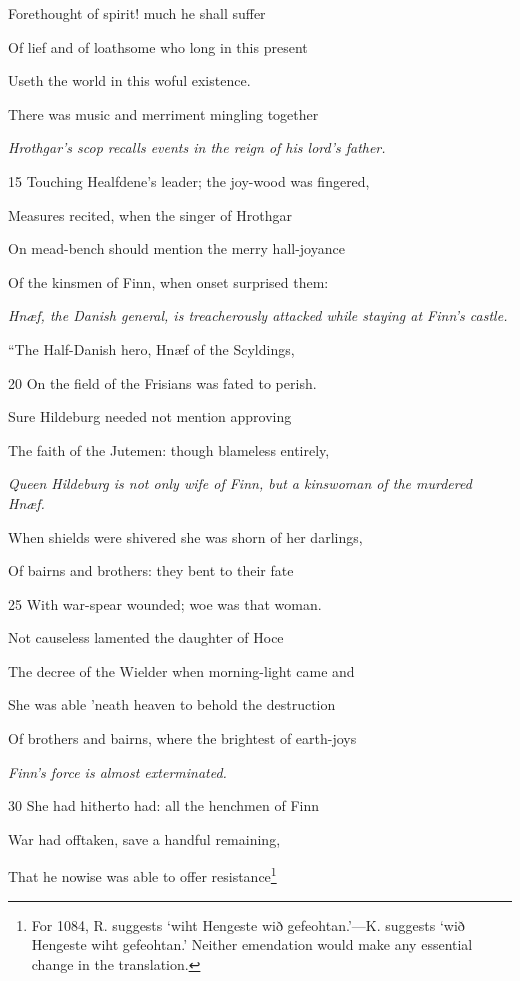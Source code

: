 Forethought of spirit! much he shall suffer

Of lief and of loathsome who long in this present

Useth the world in this woful existence.

There was music and merriment mingling together

\emph{Hrothgar’s scop
recalls events in
the reign of his
lord’s father.}

15
Touching Healfdene’s leader; the joy-wood was fingered,

Measures recited, when the singer of Hrothgar

On mead-bench should mention the merry hall-joyance

Of the kinsmen of Finn, when onset surprised them:

\emph{Hnæf, the Danish
general, is treacherously
attacked
while staying at
Finn’s castle.}

“The Half-Danish hero, Hnæf of the Scyldings,

20
On the field of the Frisians was fated to perish.

Sure Hildeburg needed not mention approving

The faith of the Jutemen: though blameless entirely,

\emph{Queen Hildeburg
is not only wife of
Finn, but a kinswoman
of the murdered
Hnæf.}

When shields were shivered she was shorn of her darlings,

Of bairns and brothers: they bent to their fate

25
With war-spear wounded; woe was that woman.

Not causeless lamented the daughter of Hoce

The decree of the Wielder when morning-light came and

She was able ’neath heaven to behold the destruction

Of brothers and bairns, where the brightest of earth-joys

\emph{Finn’s force is almost
exterminated.}

30
She had hitherto had: all the henchmen of Finn

War had offtaken, save a handful remaining,

That he nowise was able to offer resistance\footnote{For 1084, R. suggests ‘wiht Hengeste wið gefeohtan.’—K. suggests ‘wið
Hengeste wiht gefeohtan.’ Neither emendation would make any essential
change in the translation.}


